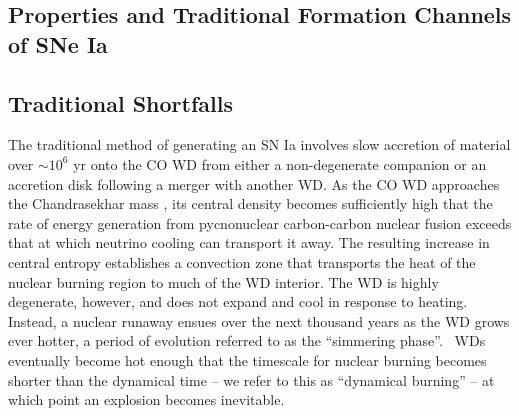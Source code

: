 

\subsection{Properties and Traditional Formation Channels of SNe Ia}
\label{ssec:old_typeia}

\subsection{Traditional Shortfalls}

The traditional method of generating an SN Ia involves slow accretion of material over $\sim10^6$ yr onto the CO WD from either a non-degenerate companion or an accretion disk following a merger with another WD.  As the CO WD approaches the Chandrasekhar mass \Mch, its central density becomes sufficiently high that the rate of energy generation from pycnonuclear carbon-carbon nuclear fusion exceeds that at which neutrino cooling can transport it away.  The resulting increase in central entropy establishes a convection zone that transports the heat of the nuclear burning region to much of the WD interior.  The WD is highly degenerate, however, and does not expand and cool in response to heating.  Instead, a nuclear runaway ensues over the next thousand years as the WD grows ever hotter, a period of evolution referred to as the ``simmering phase''.  \Mch\ WDs eventually become hot enough that the timescale for nuclear burning becomes shorter than the dynamical time -- we refer to this as ``dynamical burning'' -- at which point an explosion becomes inevitable.

